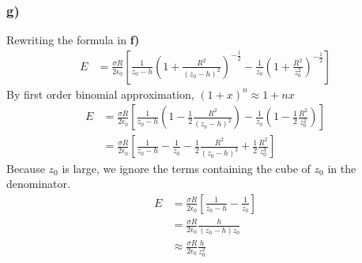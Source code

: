 \documentclass[../homework.tex]{subfiles}
\begin{document}
\subsubsection*{g)}
\indent \indent Rewriting the formula in \textbf{f)}
\begin{align*}
    E & = \frac{\sigma R}{2\epsilon_0} \left[
        \frac{1}{z_0 - h} \left(1 + \frac{R^2}{(z_0 - h)^2}\right)^{-\frac{1}{2}} - \frac{1}{z_0} \left(1 + \frac{R^2}{z_0^2}\right)^{-\frac{1}{2}}
    \right]
\end{align*}
\indent By first order binomial approximation, $(1 + x)^n \approx 1 + nx$
\begin{align*}
    E & = \frac{\sigma R}{2\epsilon_0} \left[
        \frac{1}{z_0 - h} \left(1 - \frac{1}{2}\frac{R^2}{(z_0 - h)^2}\right) - \frac{1}{z_0} \left(1 - \frac{1}{2}\frac{R^2}{z_0^2}\right)
    \right] \\[10pt]
      &= \frac{\sigma R}{2\epsilon_0} \left[
        \frac{1}{z_0 - h} - \frac{1}{z_0} - \frac{1}{2}\frac{R^2}{(z_0 - h)^3} + \frac{1}{2} \frac{R^2}{z_0^3}
    \right]
\end{align*}
\indent Because $z_0$ is large, we ignore the terms containing the cube of $z_0$ in the denominator. 
\begin{align*}
    E & = \frac{\sigma R}{2\epsilon_0} \left[
        \frac{1}{z_0 - h} - \frac{1}{z_0}
    \right] \\[10pt]
      & = \frac{\sigma R}{2\epsilon_0} \frac{h}{(z_0 - h) z_0} \\[10pt]
      & \approx \frac{\sigma R}{2\epsilon_0} \frac{h}{z_0^2}
\end{align*}
\end{document}
